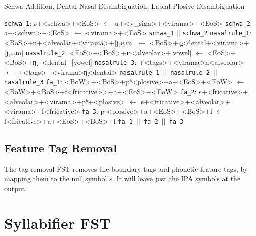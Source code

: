 
\begin{algorithm}[htpb]
	\caption{Schwa Addition, Dental Nasal Disambiguation,  Labial Plosive Disambiguation}\label{alg:disambiguation2}
	\begin{algorithmic}[1]
		\State \texttt{schwa\_1}: {\ipa ə+<schwa>+<EoS>} $\gets$ {\ipa u+<v\_sign>+<virama>+<EoS>} 
		\State \texttt{schwa\_2}: {\ipa ə+<schwa>+<EoS>} $\gets$ {\ipa <virama>+<EoS>} 
		\State \Return \texttt{schwa\_1} $||$ \texttt{schwa\_2} 
	\EndProcedure
		\State \texttt{nasalrule\_1}:
		{\ipa <BoS>+n+<alveolar+<virama>+[j,ʋ,m]} $\gets$ {\ipa <BoS>+n̪<dental+<virama>+[j,ʋ,m]} 
		\State \texttt{nasalrule\_2}:
		{\ipa <EoS>+<BoS>+n<alveolar>+[vowel]} $\gets$ {\ipa <EoS>+<BoS>+n̪+<dental+[vowel]}
		\State \texttt{nasalrule\_3}: {\ipa [k,ɡʱ,p,m,ʃ,s]+<tags>+<virama>n<alveolar>} $\gets$ {\ipa [k,ɡʱ,p,m,ʃ,s]+<tags>+<virama>n̪<dental>}
		\State \Return \texttt{nasalrule\_1 $||$ nasalrule\_2 $||$ nasalrule\_3} 
	\EndProcedure
		\State \texttt{fa\_1}: {\ipa <BoW>+<BoS>+pʰ<plosive>+a+<EoS>+<EoW>} $\gets$ {\ipa <BoW>+<BoS>+f<fricative>>+a+<EoS>+<EoW>}
		\State \texttt{fa\_2}: {\ipa s+<fricative>+<alveolar>+<virama>+pʰ+<plosive>} $\gets$ {\ipa s+<fricative>+<alveolar>+<virama>+f<fricative>}
		\State \texttt{fa\_3}: {\ipa pʰ<plosive>+a+<EoS>+<BoS>+l} $\gets$ {\ipa f<fricative>+a+<EoS>+<BoS>+l}
		\State \Return \texttt{fa\_1 $||$ fa\_2 $||$ fa\_3} 
	\EndProcedure
	\end{algorithmic}
\end{algorithm}


\subsection{Feature Tag Removal}
\label{tagremoval)}

The tag-removal FST removes the boundary tags and phonetic feature tags, by
mapping them to the null symbol {\ipa ɛ}. It will leave just the IPA symbols at
the output.

\section{Syllabifier FST}
\label{syllabification}

